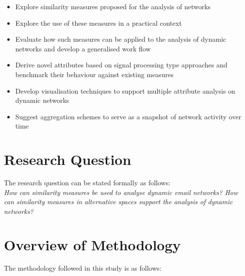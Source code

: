 \begin{itemize}
    \item Explore similarity measures proposed for the analysis of networks
    \item Explore the use of these measures in a practical context
    \item Evaluate how such measures can be applied to the analysis of dynamic networks and develop a generalised work flow
    \item Derive novel attributes based on signal processing type approaches and benchmark their behaviour against existing measures
    \item Develop visualisation techniques to support multiple attribute analysis on dynamic networks
    \item Suggest aggregation schemes to serve as a snapshot of network activity over time
\end{itemize}

\section{Research Question}

The research question can be stated formally as follows:\\

\emph{How can similarity measures be used to analyse dynamic email networks? How can similarity measures in alternative spaces support the analysis of dynamic networks?}

\section{Overview of Methodology}

The methodology followed in this study is as follows:

